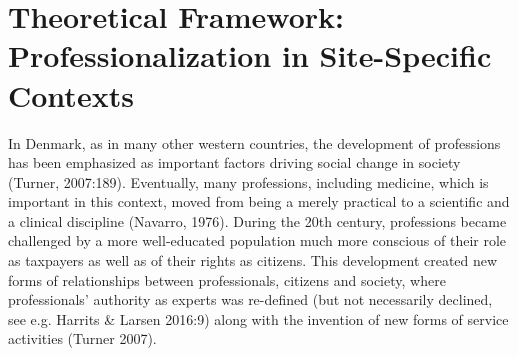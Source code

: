 \chapter{Theoretical Framework: Professionalization in Site-Specific Contexts}
In Denmark, as in many other western countries, the development of professions has been emphasized as important factors driving social change in society (Turner, 2007:189). Eventually, many professions, including medicine, which is important in this context, moved from being a merely practical to a scientific and a clinical discipline (Navarro, 1976). During the 20th century, professions became challenged by a more well-educated population much more conscious of their role as taxpayers as well as of their rights as citizens. This development created new forms of relationships between professionals, citizens and society, where professionals’ authority as experts was re-defined (but not necessarily declined, see e.g. Harrits \& Larsen 2016:9) along with the invention of new forms of service activities (Turner 2007).
\par
